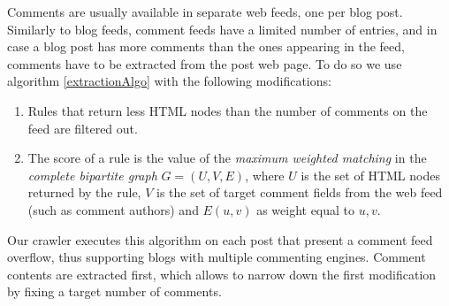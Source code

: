 Comments are usually available in separate web feeds, one per blog post. Similarly to blog feeds, comment feeds have a limited number of entries, and in case a blog post has more comments than the ones appearing in the feed, comments have to be extracted from the post web page. To do so we use algorithm \ref{extractionAlgo} with the following modifications:
\begin{enumerate}
  \item Rules that return less HTML nodes than the number of comments on the feed are filtered out.
  \item The score of a rule is the value of the \emph{maximum weighted matching} in the \emph{complete bipartite graph} $G = (U, V, E)$, where $U$ is the set of HTML nodes returned by the rule, $V$ is the set of target comment fields from the web feed (such as comment authors) and $E(u, v)$ as weight equal to \code{\ref{similarityAlgo}(}$u, v$\code{)}.
\end{enumerate}
Our crawler executes this algorithm on each post that present a comment feed overflow, thus supporting blogs with multiple commenting engines. Comment contents are extracted first, which allows to narrow down the first modification by fixing a target number of comments.
